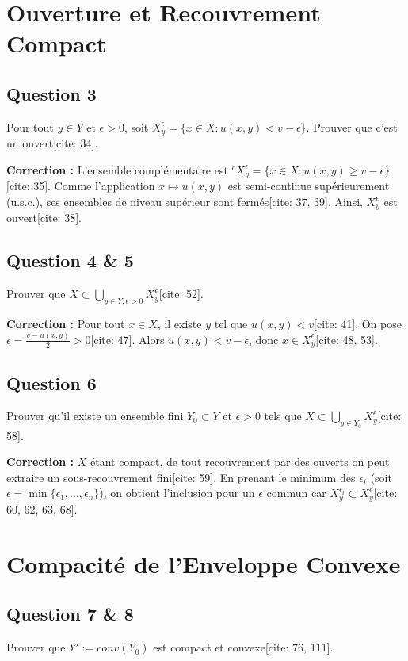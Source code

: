 \section*{Ouverture et Recouvrement Compact}

\subsection*{Question 3}
Pour tout $y \in Y$ et $\epsilon > 0$, soit $X_y^\epsilon = \{x \in X : u(x, y) < v - \epsilon\}$. Prouver que c'est un ouvert[cite: 34].

\textbf{Correction :}
L'ensemble complémentaire est $^c X_y^\epsilon = \{x \in X : u(x, y) \ge v - \epsilon\}$[cite: 35]. Comme l'application $x \mapsto u(x, y)$ est semi-continue supérieurement (u.s.c.), ses ensembles de niveau supérieur sont fermés[cite: 37, 39]. Ainsi, $X_y^\epsilon$ est ouvert[cite: 38].

\subsection*{Question 4 \& 5}
Prouver que $X \subset \bigcup_{y \in Y, \epsilon > 0} X_y^\epsilon$[cite: 52].

\textbf{Correction :}
Pour tout $x \in X$, il existe $y$ tel que $u(x, y) < v$[cite: 41]. On pose $\epsilon = \frac{v - u(x, y)}{2} > 0$[cite: 47]. Alors $u(x, y) < v - \epsilon$, donc $x \in X_y^\epsilon$[cite: 48, 53].

\subsection*{Question 6}
Prouver qu'il existe un ensemble fini $Y_0 \subset Y$ et $\epsilon > 0$ tels que $X \subset \bigcup_{y \in Y_0} X_y^\epsilon$[cite: 58].

\textbf{Correction :}
$X$ étant compact, de tout recouvrement par des ouverts on peut extraire un sous-recouvrement fini[cite: 59]. En prenant le minimum des $\epsilon_i$ (soit $\epsilon = \min\{\epsilon_1, \dots, \epsilon_n\}$), on obtient l'inclusion pour un $\epsilon$ commun car $X_y^{\epsilon_i} \subset X_y^\epsilon$[cite: 60, 62, 63, 68].

\section*{Compacité de l'Enveloppe Convexe}

\subsection*{Question 7 \& 8}
Prouver que $Y' := conv(Y_0)$ est compact et convexe[cite: 76, 111].

